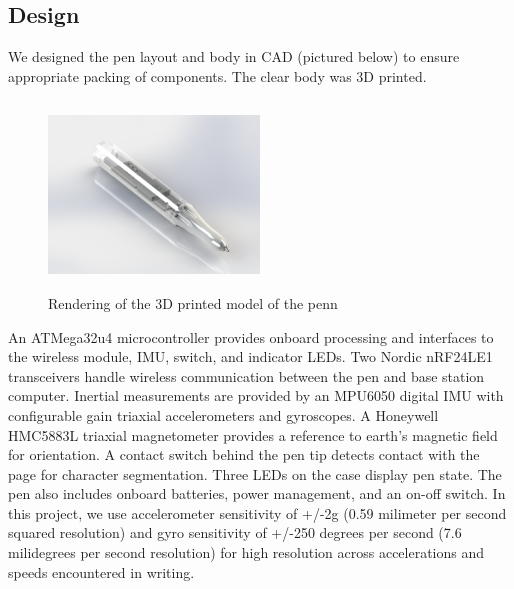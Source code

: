 \documentclass{article}
\begin{document}
\subsection{Design}
We designed the pen layout and body in CAD (pictured below) to ensure appropriate packing of components. The clear body was 3D printed.
\begin{figure}[H]
\centering
    \includegraphics[width=0.5\textwidth, height= 5cm]{pen_render.png}
    \caption{Rendering of the 3D printed model of the penn}
\end{figure}

An ATMega32u4 microcontroller provides onboard processing and interfaces to the wireless module, IMU, switch, and indicator LEDs. Two Nordic nRF24LE1 transceivers handle wireless communication between the pen and base station computer. Inertial measurements are provided by an MPU6050 digital IMU with configurable gain triaxial accelerometers and gyroscopes. A Honeywell HMC5883L triaxial magnetometer provides a reference to earth's magnetic field for orientation. A contact switch behind the pen tip detects contact with the page for character segmentation. Three LEDs on the case display pen state. The pen also includes onboard batteries, power management, and an on-off switch.
In this project, we use accelerometer sensitivity of +/-2g (0.59 milimeter per second squared resolution) and gyro sensitivity of +/-250 degrees per second (7.6 milidegrees per second resolution) for high resolution across accelerations and speeds encountered in writing. 
\end{document}

